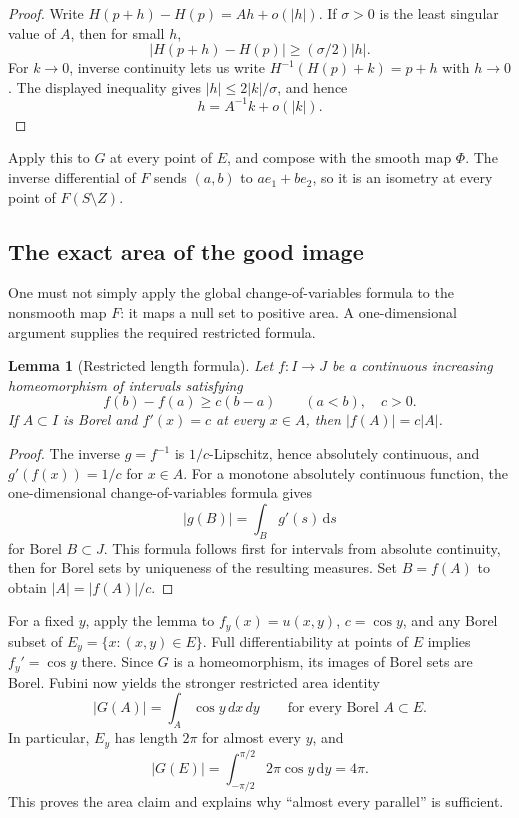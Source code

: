 \documentclass[11pt,letterpaper]{article}
\numberwithin{equation}{section}
\newtheorem{lemma}[theorem]{Lemma}
\theoremstyle{remark}
\newcommand{\dd}{\,\mathrm d}
\begin{document}
\begin{proof}
Write $H(p+h)-H(p)=Ah+o(|h|)$. If $\sigma>0$ is the least singular value of $A$, then for small $h$,
\[
 |H(p+h)-H(p)|\ge(\sigma/2)|h|.
\]
For $k\to0$, inverse continuity lets us write $H^{-1}(H(p)+k)=p+h$ with $h\to0$. The displayed inequality gives $|h|\le2|k|/\sigma$, and hence
\[
 h=A^{-1}k+o(|k|).
\]
\end{proof}

Apply this to $G$ at every point of $E$, and compose with the smooth map $\Phi$. The inverse differential of $F$ sends $(a,b)$ to $ae_1+be_2$, so it is an isometry at every point of $F(S\setminus Z)$.

\subsection{The exact area of the good image}

One must not simply apply the global change-of-variables formula to the nonsmooth map $F$: it maps a null set to positive area. A one-dimensional argument supplies the required restricted formula.

\begin{lemma}[Restricted length formula]\label{lem:length}
Let $f:I\to J$ be a continuous increasing homeomorphism of intervals satisfying
\[
 f(b)-f(a)\ge c(b-a)\qquad(a<b),\quad c>0.
\]
If $A\subset I$ is Borel and $f'(x)=c$ at every $x\in A$, then $|f(A)|=c|A|$.
\end{lemma}

\begin{proof}
The inverse $g=f^{-1}$ is $1/c$-Lipschitz, hence absolutely continuous, and $g'(f(x))=1/c$ for $x\in A$. For a monotone absolutely continuous function, the one-dimensional change-of-variables formula gives
\[
 |g(B)|=\int_B g'(s)\dd s
\]
for Borel $B\subset J$. This formula follows first for intervals from absolute continuity, then for Borel sets by uniqueness of the resulting measures. Set $B=f(A)$ to obtain $|A|=|f(A)|/c$.
\end{proof}

For a fixed $y$, apply the lemma to $f_y(x)=u(x,y)$, $c=\cos y$, and any Borel subset of $E_y=\{x:(x,y)\in E\}$. Full differentiability at points of $E$ implies $f_y'=\cos y$ there. Since $G$ is a homeomorphism, its images of Borel sets are Borel. Fubini now yields the stronger restricted area identity
\begin{equation}\label{eq:goodarea}
 |G(A)|=\int_A\cos y\,dx\,dy
 \qquad\text{for every Borel }A\subset E.
\end{equation}
In particular, $E_y$ has length $2\pi$ for almost every $y$, and
\[
 |G(E)|=\int_{-\pi/2}^{\pi/2}2\pi\cos y\dd y=4\pi.
\]
This proves the area claim and explains why ``almost every parallel'' is sufficient.
\end{document}
